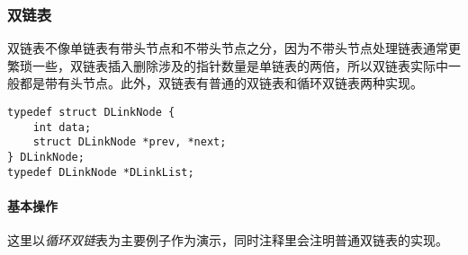 \documentclass{ctexart}
\begin{document}
\subsubsection{双链表}
双链表不像单链表有带头节点和不带头节点之分，因为不带头节点处理链表通常更繁琐一些，双链表插入删除涉及的指针数量是单链表的两倍，所以双链表实际中一般都是带有头节点。此外，双链表有普通的双链表和循环双链表两种实现。
\begin{verbatim}
typedef struct DLinkNode {
    int data;
    struct DLinkNode *prev, *next;
} DLinkNode;
typedef DLinkNode *DLinkList;
\end{verbatim}

\paragraph{基本操作} 这里以\emph{循环双链}表为主要例子作为演示，同时注释里会注明普通双链表的实现。
\end{document}
